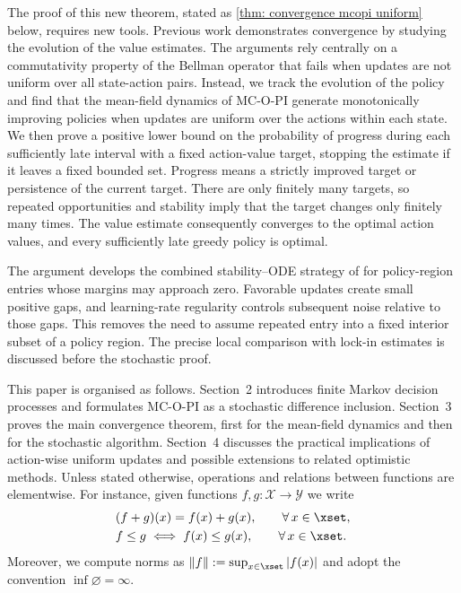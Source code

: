 

The proof of this new theorem, stated as \autoref{thm: convergence mcopi uniform} below, requires new tools.
Previous work demonstrates convergence by studying the evolution of the value estimates. The arguments rely centrally on a commutativity property of the Bellman operator that fails when updates are not uniform over all state-action pairs.
Instead, we track the evolution of the policy and find that the mean-field dynamics of MC-O-PI generate monotonically improving policies when updates are uniform over the actions within each state.
We then prove a positive lower bound on the probability of progress during each sufficiently late interval with a fixed action-value target, stopping the estimate if it leaves a fixed bounded set. Progress means a strictly improved target or persistence of the current target. There are only finitely many targets, so repeated opportunities and stability imply that the target changes only finitely many times. The value estimate consequently converges to the optimal action values, and every sufficiently late greedy policy is optimal.

The argument develops the combined stability--ODE strategy of \citet[Section~5.4]{Kushner2003StochasticApplications} for policy-region entries whose margins may approach zero. Favorable updates create small positive gaps, and learning-rate regularity controls subsequent noise relative to those gaps. This removes the need to assume repeated entry into a fixed interior subset of a policy region. The precise local comparison with lock-in estimates is discussed before the stochastic proof.

This paper is organised as follows. Section~2 introduces finite Markov decision
processes and formulates MC-O-PI as a stochastic difference inclusion. Section~3 proves the
main convergence theorem, first for the mean-field dynamics and then for the stochastic
algorithm. Section~4 discusses the practical implications of action-wise uniform updates
and possible extensions to related optimistic methods.
Unless stated otherwise, operations and relations between functions are elementwise. For instance, given functions $f, g : \mathcal X \to \mathcal Y$ we write
\begin{align*}
&(f + g)(x) = f(x) + g(x), \qquad \forall \, x \in \xset ,
    \\
&f \le g \iff f(x) \le g(x), \qquad \forall \, x \in \xset .
\end{align*}
Moreover, we compute norms as $\|f\| := \sup_{x \in \xset} |f(x)|$
and adopt the convention $\inf \varnothing = \infty$.


